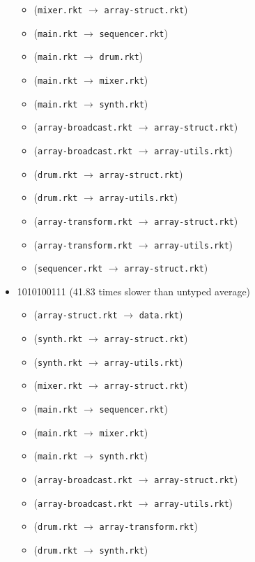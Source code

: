 \documentclass{article}
\newcommand{\mono}[1]{\texttt{#1}}
\begin{document}
\begin{itemize}
\begin{itemize}
  \item (\mono{mixer.rkt} $\rightarrow$ \mono{array-struct.rkt})
  \item (\mono{main.rkt} $\rightarrow$ \mono{sequencer.rkt})
  \item (\mono{main.rkt} $\rightarrow$ \mono{drum.rkt})
  \item (\mono{main.rkt} $\rightarrow$ \mono{mixer.rkt})
  \item (\mono{main.rkt} $\rightarrow$ \mono{synth.rkt})
  \item (\mono{array-broadcast.rkt} $\rightarrow$ \mono{array-struct.rkt})
  \item (\mono{array-broadcast.rkt} $\rightarrow$ \mono{array-utils.rkt})
  \item (\mono{drum.rkt} $\rightarrow$ \mono{array-struct.rkt})
  \item (\mono{drum.rkt} $\rightarrow$ \mono{array-utils.rkt})
  \item (\mono{array-transform.rkt} $\rightarrow$ \mono{array-struct.rkt})
  \item (\mono{array-transform.rkt} $\rightarrow$ \mono{array-utils.rkt})
  \item (\mono{sequencer.rkt} $\rightarrow$ \mono{array-struct.rkt})
  \end{itemize}
\item 1010100111 (41.83 times slower than untyped average)
  \begin{itemize}
  \item (\mono{array-struct.rkt} $\rightarrow$ \mono{data.rkt})
  \item (\mono{synth.rkt} $\rightarrow$ \mono{array-struct.rkt})
  \item (\mono{synth.rkt} $\rightarrow$ \mono{array-utils.rkt})
  \item (\mono{mixer.rkt} $\rightarrow$ \mono{array-struct.rkt})
  \item (\mono{main.rkt} $\rightarrow$ \mono{sequencer.rkt})
  \item (\mono{main.rkt} $\rightarrow$ \mono{mixer.rkt})
  \item (\mono{main.rkt} $\rightarrow$ \mono{synth.rkt})
  \item (\mono{array-broadcast.rkt} $\rightarrow$ \mono{array-struct.rkt})
  \item (\mono{array-broadcast.rkt} $\rightarrow$ \mono{array-utils.rkt})
  \item (\mono{drum.rkt} $\rightarrow$ \mono{array-transform.rkt})
  \item (\mono{drum.rkt} $\rightarrow$ \mono{synth.rkt})

\end{itemize}
\end{itemize}
\end{document}
